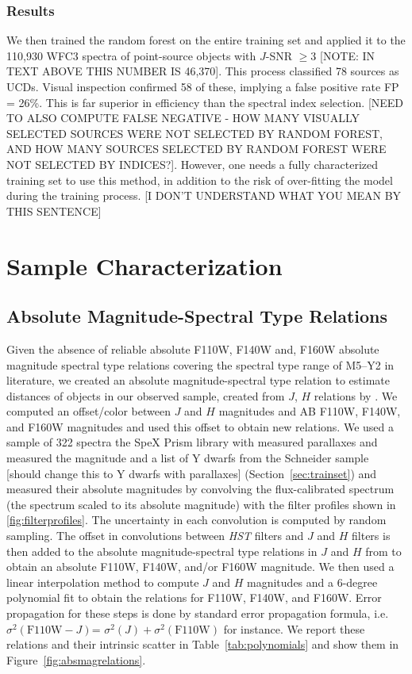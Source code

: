 \documentclass[manuscript]{aastex63}
\begin{document}
\subsubsection{Results}

We then trained the random forest on the entire training set and applied it to the 110,930 WFC3 spectra of point-source objects with $J$-SNR $\geq3$ [NOTE: IN TEXT ABOVE THIS NUMBER IS 46,370]. This process classified 78 sources as UCDs. Visual inspection confirmed 58 of these, implying a false positive rate FP = 26\%. This is far superior in efficiency than the spectral index selection. [NEED TO ALSO COMPUTE FALSE NEGATIVE - HOW MANY VISUALLY SELECTED SOURCES WERE NOT SELECTED BY RANDOM FOREST, AND HOW MANY SOURCES SELECTED BY RANDOM FOREST WERE NOT SELECTED BY INDICES?].  However, one needs a fully characterized training set to use this method, in addition to the risk of over-fitting the model during the training process. [I DON'T UNDERSTAND WHAT YOU MEAN BY THIS SENTENCE]




\section{Sample Characterization}\label{sec:results}

\subsection{ Absolute Magnitude-Spectral Type Relations }\label{sec:absmags}
Given the absence of reliable absolute F110W, F140W and, F160W absolute magnitude spectral type relations covering the spectral type range of M5--Y2 in literature, we created an absolute magnitude-spectral type relation to estimate distances of objects in our observed sample, created from $J$, $H$ relations by \cite{Pecaut2013}. We computed an offset/color between $J$ and $H$ magnitudes and AB F110W, F140W, and F160W magnitudes and used this offset to obtain new relations. We used a sample of 322 spectra the SpeX Prism library with measured parallaxes and measured the magnitude and a list of Y dwarfs from the Schneider sample [should change this to Y dwarfs with parallaxes] (Section~\ref{sec:trainset}) and measured their absolute magnitudes by convolving the flux-calibrated spectrum (the spectrum scaled to its absolute magnitude) with the filter profiles shown in \ref{fig:filterprofiles}.  The uncertainty in each convolution is computed by random sampling. The offset in convolutions between \textit{HST} filters and $J$ and $H$ filters is then added to the absolute magnitude-spectral type relations in $J$ and $H$ from \cite{Pecaut2013} to obtain an absolute F110W, F140W, and/or F160W magnitude. We then used a linear interpolation method to compute $J$ and $H$ magnitudes and a 6-degree polynomial fit to obtain the relations for F110W, F140W, and F160W. Error propagation for these steps is done by standard error propagation formula, i.e. $\sigma ^2 (\mathrm{F110W}-J)$= $\sigma ^2 (J) + \sigma ^2 (\mathrm{F110W})$ for instance. We report these relations and their intrinsic scatter in Table~\ref{tab:polynomials} and show them in Figure~\ref{fig:absmagrelations}.
\end{document}
